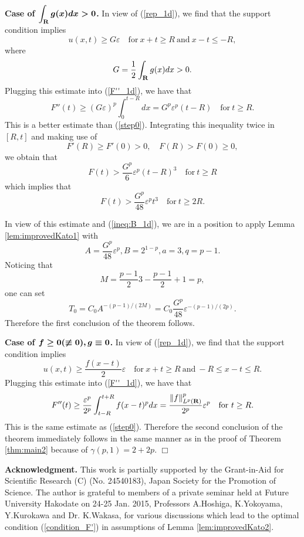 \documentclass[a4paper,12pt]{article}
\numberwithin{equation}{section}
\def\R{{\bf R}}
\def\d{\displaystyle}
\def\e{{\varepsilon}}
\def\v#1{\mbox{\boldmath $#1$}}
\begin{document}
{\bf Case of $\v{\d\int_{\R}g(x)dx>0}$.}
In view of (\ref{rep_1d}),  we find that the support condition implies
\[
u(x,t)\ge G\e\quad\mbox{for}\ x+t\ge R\ \mbox{and}\ x-t\le-R,
\]
where
\[
G=\frac{1}{2}\int_{\R}g(x)dx>0.
\]
Plugging this estimate into (\ref{F''_1d}), we have that
\[
F''(t)\ge\left(G\e\right)^p\int_0^{t-R}dx=G^p\e^p(t-R)
\quad\mbox{for}\ t\ge R.
\]
This is a better estimate than (\ref{step0}).
Integrating this inequality twice in $[R,t]$ and making use of
\[
F'(R)\ge F'(0)>0,\quad F(R)>F(0)\ge0,
\]
we obtain that
\[
F(t)>\frac{G^p}{6}\e^p(t-R)^3
\quad\mbox{for}\ t\ge R
\]
which implies that
\[
F(t)>\frac{G^p}{48}\e^pt^3
\quad\mbox{for}\ t\ge2R.
\]
\par
In view of this estimate and (\ref{ineq:B_1d}),
we are in a position to apply Lemma \ref{lem:improvedKato1} with
\[
A=\frac{G^p}{48}\e^p,B=2^{1-p},a=3,q=p-1.
\]
Noticing that
\[
M=\frac{p-1}{2}3-\frac{p-1}{2}+1=p,
\]
one can set
\[
T_0=C_0A^{-(p-1)/(2M)}=C_0\frac{G^p}{48}\e^{-(p-1)/(2p)}.
\]
Therefore the first conclusion of the theorem follows.
\vskip10pt
\par\noindent
{\bf Case of $\v{f\ge0(\not\equiv0),g\equiv0}$.}
In view of (\ref{rep_1d}),  we find that the support condition implies
\[
u(x,t)\ge\frac{f(x-t)}{2}\e\quad\mbox{for}\ x+t\ge R\ \mbox{and}\ -R\le x-t\le R.
\]
Plugging this estimate into (\ref{F''_1d}), we have that
\[
F''(t)\ge\frac{\e^p}{2^p}\int_{t-R}^{t+R}f(x-t)^pdx
=\frac{\|f\|^p_{L^p(\R)}}{2^p}\e^p
\quad\mbox{for}\ t\ge R.
\]
This is the same estimate as (\ref{step0}).
Therefore the second conclusion of the theorem immediately follows
in the same manner as in the proof of Theorem \ref{thm:main2} because of $\gamma(p,1)=2+2p$.
\hfill$\Box$
\vskip10pt
\par\noindent
{\bf Acknowledgment.} This work is partially supported by
the Grant-in-Aid for Scientific Research (C) (No. 24540183),
Japan Society for the Promotion of Science.
The author is grateful to members of a private seminar
held at Future University Hakodate on 24-25 Jan. 2015,
Professors A.Hoshiga, K.Yokoyama, Y.Kurokawa and Dr. K.Wakasa,
for various discussions which lead to the optimal condition (\ref{condition_F'}) in assumptions of Lemma \ref{lem:improvedKato2}.
\end{document}
